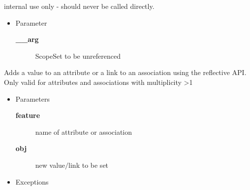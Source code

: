 \begin{desc}internal use only - should never be called directly.
\begin{itemize}
\item{Parameter
  \begin{description}
   \item[{\bf \_\_arg}]{ScopeSet to be unreferenced}
  \end{description}}
\end{itemize}
\end{desc}

\begin{desc}Adds a value to an attribute or a link to an association using the
 reflective API. Only valid for attributes and associations with
 multiplicity \textgreater  1
\begin{itemize}
\item{Parameters
  \begin{description}
   \item[{\bf feature}]{name of attribute or association}
   \item[{\bf obj}]{new value$/$link to be set}
  \end{description}}
\end{itemize}
\begin{itemize}
\item{{Exceptions}
}
\end{itemize}
\end{desc}

